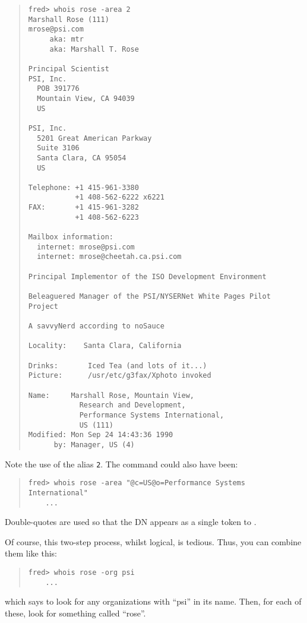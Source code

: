 \begin{quote}\small\begin{verbatim}
fred> whois rose -area 2
Marshall Rose (111)                                 mrose@psi.com
     aka: mtr
     aka: Marshall T. Rose

Principal Scientist
PSI, Inc.
  POB 391776
  Mountain View, CA 94039
  US

PSI, Inc.
  5201 Great American Parkway
  Suite 3106
  Santa Clara, CA 95054
  US

Telephone: +1 415-961-3380
           +1 408-562-6222 x6221
FAX:       +1 415-961-3282
           +1 408-562-6223

Mailbox information:
  internet: mrose@psi.com
  internet: mrose@cheetah.ca.psi.com

Principal Implementor of the ISO Development Environment

Beleaguered Manager of the PSI/NYSERNet White Pages Pilot Project

A savvyNerd according to noSauce

Locality:    Santa Clara, California

Drinks:       Iced Tea (and lots of it...)
Picture:      /usr/etc/g3fax/Xphoto invoked

Name:     Marshall Rose, Mountain View,
            Research and Development,
            Performance Systems International,
            US (111)
Modified: Mon Sep 24 14:43:36 1990
      by: Manager, US (4)
\end{verbatim}\end{quote}
Note the use of the alias \verb"2".
The command could also have been:
\begin{quote}\small\begin{verbatim}
fred> whois rose -area "@c=US@o=Performance Systems International"
    ...
\end{verbatim}\end{quote}
Double-quotes are used so that the DN appears as a single token to .

Of course,
this two-step process,
whilst logical, is tedious.
Thus, you can combine them like this:
\begin{quote}\small\begin{verbatim}
fred> whois rose -org psi
    ...
\end{verbatim}\end{quote}
which says to look for any organizations with ``psi'' in its name.
Then, for each of these,
look for something called ``rose''.

